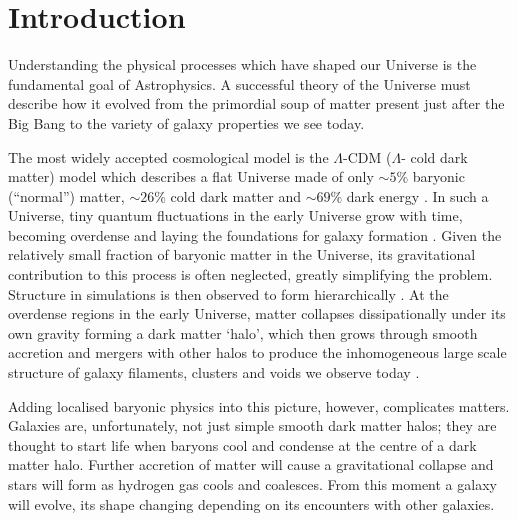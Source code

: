 \chapter{Introduction}\label{chap:intro}

Understanding the physical processes which have shaped our Universe is the fundamental goal of Astrophysics. A successful theory of the Universe must describe how it evolved from the primordial soup of matter present just after the Big Bang to the variety of galaxy properties we see today. 

The most widely accepted cosmological model is the $\Lambda$-CDM ($\Lambda$- cold dark matter) model which describes a flat Universe made of only $\sim5\%$ baryonic (``normal'') matter, $\sim26\%$ cold dark matter and $\sim69\%$ dark energy \citep{planck16}. In such a Universe, tiny quantum fluctuations in the early Universe grow with time, becoming overdense and laying the foundations for galaxy formation \citep{guth82, hawking82, linde82, starobinsky82}. Given the relatively small fraction of baryonic matter in the Universe, its gravitational contribution to this process is often neglected, greatly simplifying the problem. Structure in simulations is then observed to form hierarchically \citep{press74, gott75, white78, aarseth79, gott79, turner79, efstathiou81, davis85}. At the overdense regions in the early Universe, matter collapses dissipationally under its own gravity forming a dark matter `halo', which then grows through smooth accretion and mergers with other halos to produce the inhomogeneous large scale structure of galaxy filaments, clusters and voids we observe today \citep[see comprehensive review by][]{frenk12}. 

Adding localised baryonic physics into this picture, however, complicates matters. Galaxies are, unfortunately, not just simple smooth dark matter halos; they are thought to start life when baryons cool and condense at the centre of a dark matter halo. Further accretion of matter will cause a gravitational collapse \citep[if angular momentum is present as a result of tidal torques then a rotating gas disc will form][]{fall80, barnes87} and stars will form as hydrogen gas cools and coalesces. From this moment a galaxy will evolve, its shape changing depending on its encounters with other galaxies. 


